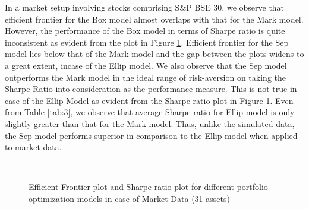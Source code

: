 In a  market setup involving stocks comprising S\&P BSE 30, we observe that efficient frontier for the Box model almost overlaps with that for the Mark model. However, the performance of the Box model in terms of Sharpe ratio is quite inconsistent as evident from the plot in Figure \ref{fig:3}. Efficient frontier for the Sep model lies below that of the Mark model and the gap between the plots widens to a great extent, incase of the Ellip model. We also observe that the Sep model outperforms the Mark model in the ideal range of risk-aversion on taking the Sharpe Ratio into consideration as the performance measure. This is not true in case of the Ellip Model as evident from the Sharpe ratio plot in Figure \ref{fig:3}. Even from Table \ref{tab:3}, we observe that average Sharpe ratio for Ellip model is only slightly greater than that for the Mark model. Thus, unlike the simulated data, the Sep model performs superior in comparison to the Ellip model when applied to market data.
\begin{figure}[!h]
    
    
     \hfill
   \\
   \caption{Efficient Frontier plot and Sharpe ratio plot for different portfolio optimization models in case of Market Data (31 assets)}
   \label{fig:3}
\end{figure}

